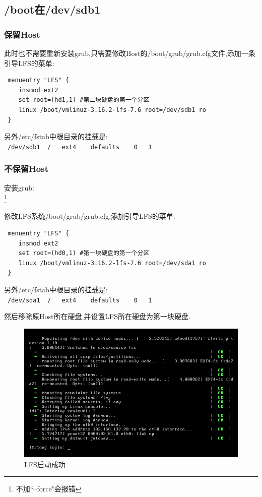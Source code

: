 \subsection{/boot在/dev/sdb1}
\subsubsection{保留Host}
此时也不需要重新安装grub,只需要修改Host的/boot/grub/grub.cfg文件,添加一条
 引导LFS的菜单:
 \vspace{-1ex}
 \begin{verbatim}
 menuentry "LFS" {
    insmod ext2
    set root=(hd1,1) #第二块硬盘的第一个分区
    linux /boot/vmlinuz-3.16.2-lfs-7.6 root=/dev/sdb1 ro
 }
\end{verbatim}
\vspace{-2ex}
 \par
 另外/etc/fstab中根目录的挂载是:\\
\verb" /dev/sdb1  /   ext4    defaults    0   1"

\subsubsection{不保留Host}
安装grub:\\
\footnote[1]{不加``--force"会报错}
\par
修改LFS系统/boot/grub/grub.cfg,添加引导LFS的菜单:
\vspace{-1ex}
 \begin{verbatim}
 menuentry "LFS" {
    insmod ext2
    set root=(hd0,1) #第一块硬盘的第一个分区
    linux /boot/vmlinuz-3.16.2-lfs-7.6 root=/dev/sda1 ro
 }
\end{verbatim}
\vspace{-2ex}
 \par
 另外/etc/fstab中根目录的挂载是:\\
\verb" /dev/sda1  /   ext4    defaults    0   1"
\par
然后移除原Host所在硬盘,并设置LFS所在硬盘为第一块硬盘.
\begin{figure}[h]
\centering
\includegraphics[width=\textwidth]{pic/LFS.PNG}
\caption{LFS启动成功}
\end{figure}

